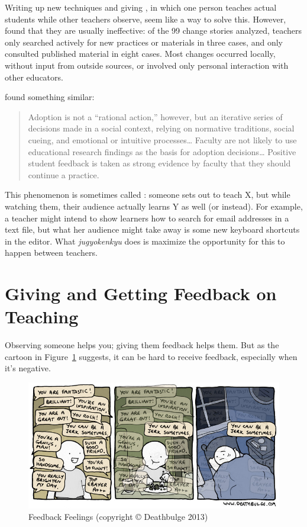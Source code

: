 Writing up new techniques and giving , in which one person teaches actual
students while other teachers observe, seem like a way to solve
this. However, \cite{Finc2007,Finc2012} found that they
are usually ineffective: of the 99 change stories analyzed, teachers
only searched actively for new practices or materials in three cases,
and only consulted published material in eight cases. Most changes
occurred locally, without input from outside sources, or involved only
personal interaction with other educators.

\cite{Bark2015} found something similar:

\begin{quote}

Adoption is not a ``rational action,'' however, but an iterative series
of decisions made in a social context, relying on normative
traditions, social cueing, and emotional or intuitive
processes{\ldots} Faculty are not likely to use educational
research findings as the basis for adoption decisions{\ldots}
Positive student feedback is taken as strong evidence by faculty that
they should continue a practice.

\end{quote}

This phenomenon is sometimes called : someone sets out to teach X,
but while watching them, their audience actually learns Y as well (or
instead). For example, a teacher might intend to show learners how to
search for email addresses in a text file, but what her audience might
take away is some new keyboard shortcuts in the editor. What
\emph{jugyokenkyu} does is maximize the opportunity for this to happen
between teachers.

\section{Giving and Getting Feedback on Teaching}\label{s:performance-feedback}

Observing someone helps you; giving them feedback helps them. But as the
cartoon in Figure~\ref{f:performance-feedback-feelings} suggests, it can
be hard to receive feedback, especially when it's negative.

\begin{figure}
\centering
\includegraphics{../../figures/deathbulge-jerk.jpg}
\caption{Feedback Feelings (copyright © Deathbulge 2013)}
\label{f:performance-feedback-feelings}
\end{figure}

